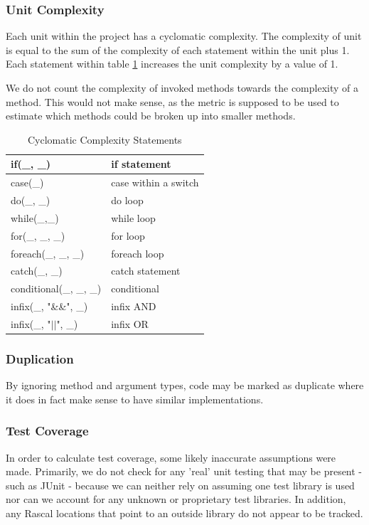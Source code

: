 \documentclass{article}
\begin{document}
\subsubsection{Unit Complexity}
Each unit within the project has a cyclomatic complexity. The complexity of unit is equal to the  sum of the complexity of each statement within the unit plus 1. Each statement within table \ref{complexityvalues} increases the unit complexity by a value of 1.

We do not count the complexity of invoked methods towards the complexity of a method. This would not make sense, as the metric is supposed to be used to estimate which methods could be broken up into smaller methods.

\begin{table}[h!tbp]
	\caption{Cyclomatic Complexity Statements}
	\label{complexityvalues}
	\begin{tabular}{l|l}	
		\hline
		if(\_, \_)					&			if statement \\
		\hline
		case(\_)					&			case within a switch \\
		\hline
		do(\_, \_)					&			do loop \\
		\hline
		while(\_,\_)				&			while loop \\
		\hline
		for(\_, \_, \_)				&			for loop \\
		\hline
		foreach(\_, \_, \_)			&			foreach loop \\
		\hline
		catch(\_, \_)				&			catch statement \\
		\hline
		conditional(\_, \_, \_)		&			conditional \\
		\hline
		infix(\_, "\&\&", \_)		&			infix AND \\
		\hline
		infix(\_, "\(||\)", \_)		&			infix OR \\
		\hline
	\end{tabular}
\end{table}

\subsubsection{Duplication}
By ignoring method and argument types, code may be marked as duplicate where it does in fact make sense to have similar implementations.

\subsubsection{Test Coverage} \label{assumetests}
In order to calculate test coverage, some likely inaccurate assumptions were made.
Primarily, we do not check for any 'real' unit testing that may be present - such as JUnit - because we can neither rely on assuming one test library is used nor can we account for any unknown or proprietary test libraries. In addition, any Rascal locations that point to an outside library do not appear to be tracked.
\end{document}

